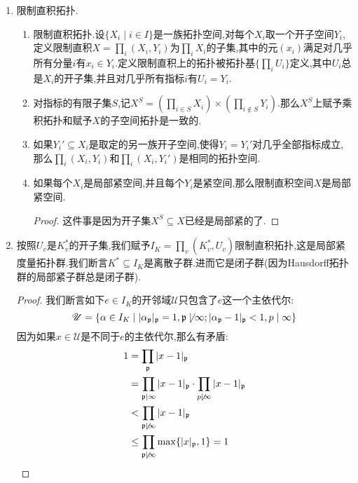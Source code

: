 \begin{enumerate}
\begin{proof}
    	为此任取$\alpha\in I_K$,那么按照$I_K/I_K^{S_{\infty}}\cong J_K$,就有$(\alpha)=\prod_{\mathfrak{p}}\mathfrak{p}^{v_{\mathfrak{p}}(\alpha_{\mathfrak{p}})}$和某个$\alpha_r$在相同的理想类中,于是存在$a\in K^*$使得$(\alpha)=a_r(a)$.取$\alpha'=\alpha a^{-1}\in I_K$,那么有$(\alpha')=a_r\in I_K^S$,于是$\alpha\in I_K^SK^*$.
    \end{proof}
    \item 限制直积拓扑.
    \begin{enumerate}[(1)]
    	\item 限制直积拓扑.设$\{X_i\mid i\in I\}$是一族拓扑空间,对每个$X_i$取一个开子空间$Y_i$,定义限制直积$X=\prod_i(X_i,Y_i)$为$\prod_iX_i$的子集,其中的元$(x_i)$满足对几乎所有分量$i$有$x_i\in Y_i$.定义限制直积上的拓扑被拓扑基$\{\prod_iU_i\}$定义,其中$U_i$总是$X_i$的开子集,并且对几乎所有指标$i$有$U_i=Y_i$.
    	\item 对指标的有限子集$S$,记$X^S=\left(\prod_{i\in S}X_i\right)\times\left(\prod_{i\not\in S}Y_i\right)$.那么$X^S$上赋予乘积拓扑和赋予$X$的子空间拓扑是一致的.
    	\item 如果$Y_i'\subseteq X_i$是取定的另一族开子空间,使得$Y_i=Y_i'$对几乎全部指标成立,那么$\prod_i(X_i,Y_i)$和$\prod_i(X_i,Y_i')$是相同的拓扑空间.
    	\item 如果每个$X_i$是局部紧空间,并且每个$Y_i$是紧空间,那么限制直积空间$X$是局部紧空间.
    	\begin{proof}
    		
    		这件事是因为开子集$X^S\subseteq X$已经是局部紧的了.
    	\end{proof}
    \end{enumerate}
    \item 按照$U_v$是$K_v^*$的开子集,我们赋予$I_K=\prod_v(K_v^*,U_v)$限制直积拓扑,这是局部紧度量拓扑群.我们断言$K^*\subseteq I_K$是离散子群.进而它是闭子群(因为Hausdorff拓扑群的局部紧子群总是闭子群).
    \begin{proof}
    	
    	我们断言如下$e\in I_K$的开邻域$\mathscr{U}$只包含了$e$这一个主依代尔:
    	$$\mathscr{U}=\{\alpha\in I_K\mid|\alpha_{\mathfrak{p}}|_{\mathfrak{p}}=1,\mathfrak{p}\not\mid\infty;|\alpha_{\mathfrak{p}}-1|_{\mathfrak{p}}<1,p\mid\infty\}$$
    	因为如果$x\in\mathscr{U}$是不同于$e$的主依代尔,那么有矛盾:
    	\begin{align*}
    		1&=\prod_{\mathfrak{p}}|x-1|_{\mathfrak{p}}\\&=\prod_{\mathfrak{p}\mid\infty}|x-1|_{\mathfrak{p}}\cdot\prod_{p\not\mid\infty}|x-1|_{\mathfrak{p}}\\&<\prod_{\mathfrak{p}\not\mid\infty}|x-1|_{\mathfrak{p}}\\&\le\prod_{\mathfrak{p}\not\mid\infty}\max\{|x|_{\mathfrak{p}},1\}=1
    	\end{align*}
    \end{proof}
\end{enumerate}



